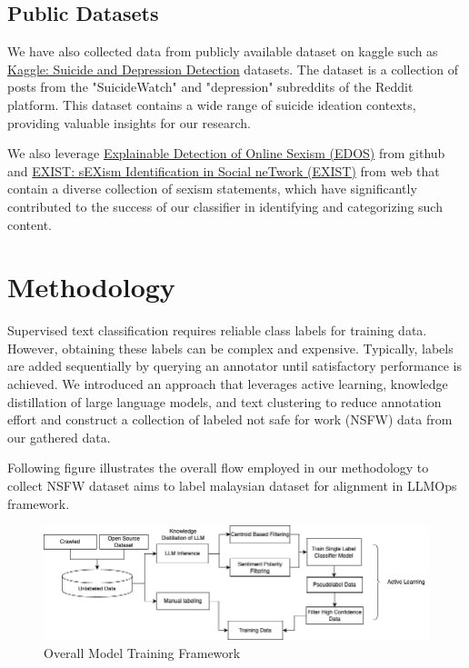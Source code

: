 \documentclass[preprint]{article}
\begin{document}
\subsection{Public Datasets}

We have also collected data from publicly available dataset on kaggle such as \href{https://www.kaggle.com/datasets/nikhileswarkomati/suicide-watch}{Kaggle: Suicide and Depression Detection} datasets. The dataset is a collection of posts from the "SuicideWatch" and "depression" subreddits of the Reddit platform. This dataset contains a wide range of suicide ideation contexts, providing valuable insights for our research.

We also leverage \href{https://github.com/rewire-online/edos}{Explainable Detection of Online Sexism (EDOS)} from github and \href{http://nlp.uned.es/exist2021/}{EXIST: sEXism Identification in Social neTwork (EXIST)} from web that contain a diverse collection of sexism statements, which have significantly contributed to the success of our classifier in identifying and categorizing such content.




\section{Methodology}

Supervised text classification requires reliable class labels for training data. However, obtaining these labels can be complex and expensive. Typically, labels are added sequentially by querying an annotator until satisfactory performance is achieved. We introduced an approach that leverages active learning, knowledge distillation of large language models, and text clustering to reduce annotation effort and construct a collection of labeled not safe for work (NSFW) data from our gathered data.

Following figure illustrates the overall flow employed in our methodology to collect NSFW dataset aims to label malaysian dataset for alignment in LLMOps framework.

\begin{figure}[h]
  \centering
  \includegraphics[width=0.8\linewidth]{img/flow-sfw.png}
  \caption{Overall Model Training Framework}
\end{figure}
\end{document}
